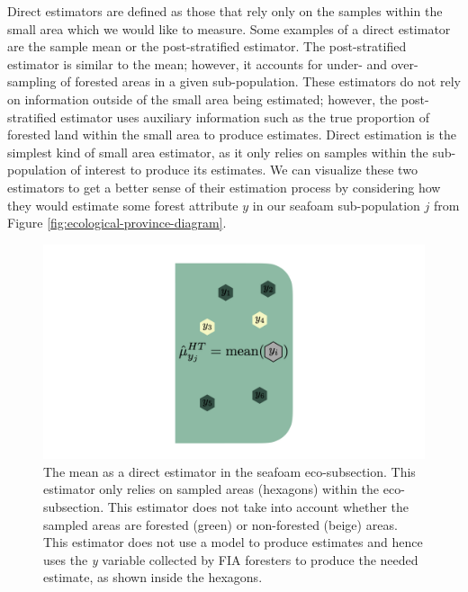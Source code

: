 \documentclass[12pt,twoside]{reedthesis}
\begin{document}
Direct estimators are defined as those that rely only on the samples within the small area which we would like to measure. Some examples of a direct estimator are the sample mean or the post-stratified estimator. The post-stratified estimator is similar to the mean; however, it accounts for under- and over-sampling of forested areas in a given sub-population. These estimators do not rely on information outside of the small area being estimated; however, the post-stratified estimator uses auxiliary information such as the true proportion of forested land within the small area to produce estimates. Direct estimation is the simplest kind of small area estimator, as it only relies on samples within the sub-population of interest to produce its estimates. We can visualize these two estimators to get a better sense of their estimation process by considering how they would estimate some forest attribute \(y\) in our seafoam sub-population \(j\) from Figure \ref{fig:ecological-province-diagram}.
\begin{figure}

{\centering \includegraphics[width=1\linewidth]{figure/mean-diagram} 

}

\caption[The mean as a direct estimator]{The mean as a direct estimator in the seafoam eco-subsection. This estimator only relies on sampled areas (hexagons) within the eco-subsection. This estimator does not take into account whether the sampled areas are forested (green) or non-forested (beige) areas. This estimator does not use a model to produce estimates and hence uses the \textit{y} variable collected by FIA foresters to produce the needed estimate, as shown inside the hexagons.}\label{fig:mean-diagram}
\end{figure}
\clearpage
\end{document}
